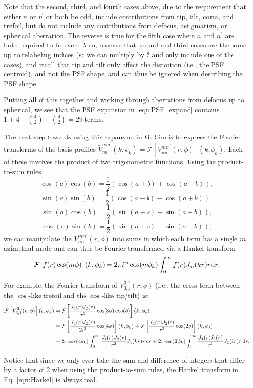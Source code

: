 \documentclass{article}
\begin{document}
Note that the second, third, and fourth cases above, due to the requirement that either $n$ or $n^\prime$ or both be odd, include contributions from tip, tilt, coma, and trefoil, but do not include any contributions from defocus, astigmatism, or spherical aberration.
The reverse is true for the fifth case where $n$ and $n^\prime$ are both required to be even.
Also, observe that second and third cases are the same up to relabeling indices (so we can multiply by 2 and only include one of the cases), and recall that tip and tilt only affect the distortion (i.e., the PSF centroid), and not the PSF shape, and can thus be ignored when describing the PSF shape.

Putting all of this together and working through aberrations from defocus up to spherical, we see that the PSF expansion in \ref{eqn:PSF_expand} contains $1 + 4 + \binom{4}{2} + \binom{4}{2} = 29$ terms.

The next step towards using this expansion in GalSim is to express the Fourier transforms of the basis profiles $\widetilde{V}_{n n^\prime}^{m m^\prime}(k, \phi_k) = \mathcal{F} \left[V_{n n^\prime}^{m m^\prime}(r, \phi)\right] (k, \phi_k)$.
Each of these involves the product of two trigonometric functions.
Using the product-to-sum rules,
\begin{equation}
  \cos(a) \cos(b) = \frac{1}{2}\left(\cos(a+b) + \cos(a-b)\right),
\end{equation}
\begin{equation}
  \sin(a) \sin(b) = \frac{1}{2}\left(\cos(a-b) - \cos(a+b)\right),
\end{equation}
\begin{equation}
  \sin(a) \cos(b) = \frac{1}{2}\left(\sin(a+b) + \sin(a-b)\right),
\end{equation}
\begin{equation}
  \cos(a) \sin(b) = \frac{1}{2}\left(\sin(a+b) - \sin(a-b)\right),
\end{equation}
we can manipulate the $V_{n n^\prime}^{m m^\prime}(r, \phi)$ into sums in which each term has a single $m$ azimuthal mode and can thus be Fourier transformed via a Hankel transform:
\begin{equation}
  \label{eqn:Hankel}
  \mathcal{F} \left[f(r) \cos(m \phi) \right](k, \phi_k) = 2 \pi i^m \cos(m \phi_k) \int_0^\infty f(r) J_m(k r) r \dif{r}.
\end{equation}

For example, the Fourier transform of $V_{3,1}^{3,1}(r, \phi)$ (i.e., the cross term between the $\cos$-like trefoil and the $\cos$-like tip/tilt) is:
\begin{align}
  \mathcal{F} \left[V_{3,1}^{3,1}(r, \phi)\right](k, \phi_k) &= \mathcal{F} \left[\frac{J_4(r) J_2(r)}{r^2} \cos(3 \phi) \cos(\phi)\right](k, \phi_k) \\
  &= \mathcal{F} \left[\frac{J_4(r) J_2(r)}{2 r^2} \cos(4 \phi)\right](k, \phi_k) + \mathcal{F} \left[\frac{J_4(r) J_2(r)}{r^2} \cos(2 \phi)\right](k, \phi_k) \\
  &= 2 \pi \cos(4 \phi_k) \int_0^\infty \frac{J_4(r) J_2(r)}{r^2} J_4(k r) r \dif{r} + 2 \pi \cos(2 \phi_k) \int_0^\infty \frac{J_4(r) J_2(r)}{r^2} J_2(k r) r \dif{r}.
\end{align}

Notice that since we only ever take the sum and difference of integers that differ by a factor of 2 when using the product-to-sum rules, the Hankel transform in Eq. \ref{eqn:Hankel} is always real.
\end{document}
